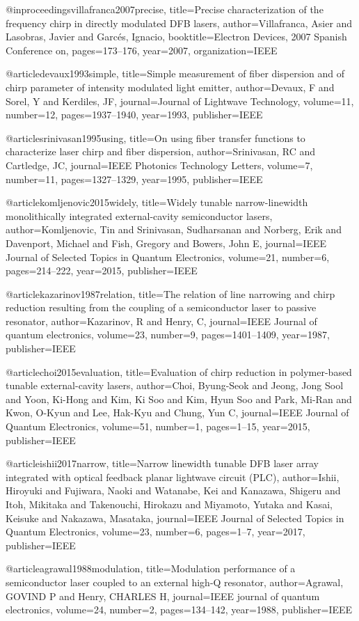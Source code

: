 @inproceedings{villafranca2007precise,
  title={Precise characterization of the frequency chirp in directly modulated DFB lasers},
  author={Villafranca, Asier and Lasobras, Javier and Garc{\'e}s, Ignacio},
  booktitle={Electron Devices, 2007 Spanish Conference on},
  pages={173--176},
  year={2007},
  organization={IEEE}
}

@article{devaux1993simple,
  title={Simple measurement of fiber dispersion and of chirp parameter of intensity modulated light emitter},
  author={Devaux, F and Sorel, Y and Kerdiles, JF},
  journal={Journal of Lightwave Technology},
  volume={11},
  number={12},
  pages={1937--1940},
  year={1993},
  publisher={IEEE}
}

@article{srinivasan1995using,
  title={On using fiber transfer functions to characterize laser chirp and fiber dispersion},
  author={Srinivasan, RC and Cartledge, JC},
  journal={IEEE Photonics Technology Letters},
  volume={7},
  number={11},
  pages={1327--1329},
  year={1995},
  publisher={IEEE}
}

@article{komljenovic2015widely,
  title={Widely tunable narrow-linewidth monolithically integrated external-cavity semiconductor lasers},
  author={Komljenovic, Tin and Srinivasan, Sudharsanan and Norberg, Erik and Davenport, Michael and Fish, Gregory and Bowers, John E},
  journal={IEEE Journal of Selected Topics in Quantum Electronics},
  volume={21},
  number={6},
  pages={214--222},
  year={2015},
  publisher={IEEE}
}

@article{kazarinov1987relation,
  title={The relation of line narrowing and chirp reduction resulting from the coupling of a semiconductor laser to passive resonator},
  author={Kazarinov, R and Henry, C},
  journal={IEEE Journal of quantum electronics},
  volume={23},
  number={9},
  pages={1401--1409},
  year={1987},
  publisher={IEEE}
}

@article{choi2015evaluation,
  title={Evaluation of chirp reduction in polymer-based tunable external-cavity lasers},
  author={Choi, Byung-Seok and Jeong, Jong Sool and Yoon, Ki-Hong and Kim, Ki Soo and Kim, Hyun Soo and Park, Mi-Ran and Kwon, O-Kyun and Lee, Hak-Kyu and Chung, Yun C},
  journal={IEEE Journal of Quantum Electronics},
  volume={51},
  number={1},
  pages={1--15},
  year={2015},
  publisher={IEEE}
}

@article{ishii2017narrow,
  title={Narrow linewidth tunable DFB laser array integrated with optical feedback planar lightwave circuit (PLC)},
  author={Ishii, Hiroyuki and Fujiwara, Naoki and Watanabe, Kei and Kanazawa, Shigeru and Itoh, Mikitaka and Takenouchi, Hirokazu and Miyamoto, Yutaka and Kasai, Keisuke and Nakazawa, Masataka},
  journal={IEEE Journal of Selected Topics in Quantum Electronics},
  volume={23},
  number={6},
  pages={1--7},
  year={2017},
  publisher={IEEE}
}

@article{agrawal1988modulation,
  title={Modulation performance of a semiconductor laser coupled to an external high-Q resonator},
  author={Agrawal, GOVIND P and Henry, CHARLES H},
  journal={IEEE journal of quantum electronics},
  volume={24},
  number={2},
  pages={134--142},
  year={1988},
  publisher={IEEE}
}
